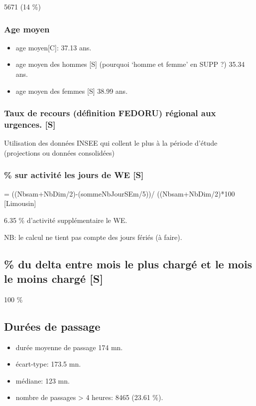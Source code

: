\documentclass[]{article}
\begin{document}
5671 (14 \%)

\subsubsection{Age moyen}\label{age-moyen}

\begin{itemize}
\item
  age moyen{[}C{]}: 37.13 ans.
\item
  age moyen des hommes {[}S{]} (pourquoi `homme et femme' en SUPP ?)
  35.34 ans.
\item
  age moyen des femmes {[}S{]} 38.99 ans.
\end{itemize}

\subsubsection{Taux de recours (définition FEDORU) régional aux
urgences.
{[}S{]}}\label{taux-de-recours-definition-fedoru-regional-aux-urgences.-s}

Utilisation des données INSEE qui collent le plus à la période d'étude
(projections ou données consolidées)

\subsubsection{\% sur activité les jours de WE
{[}S{]}}\label{sur-activite-les-jours-de-we-s}

= ((Nbsam+NbDim/2)-(sommeNbJourSEm/5))/ ((Nbsam+NbDim/2)*100
{[}Limousin{]}

6.35 \% d'activité supplémentaire le WE.

NB: le calcul ne tient pas compte des jours fériés (à faire).

\subsection{\% du delta entre mois le plus chargé et le mois le moins
chargé
{[}S{]}}\label{du-delta-entre-mois-le-plus-charge-et-le-mois-le-moins-charge-s}

100 \%

\subsection{Durées de passage}\label{durees-de-passage}

\begin{itemize}
\itemsep1pt\parskip0pt
\item
  durée moyenne de passage 174 mn.
\item
  écart-type: 173.5 mn.
\item
  médiane: 123 mn.
\item
  nombre de passages \textgreater{} 4 heures: 8465 (23.61 \%).
\end{itemize}
\end{document}
